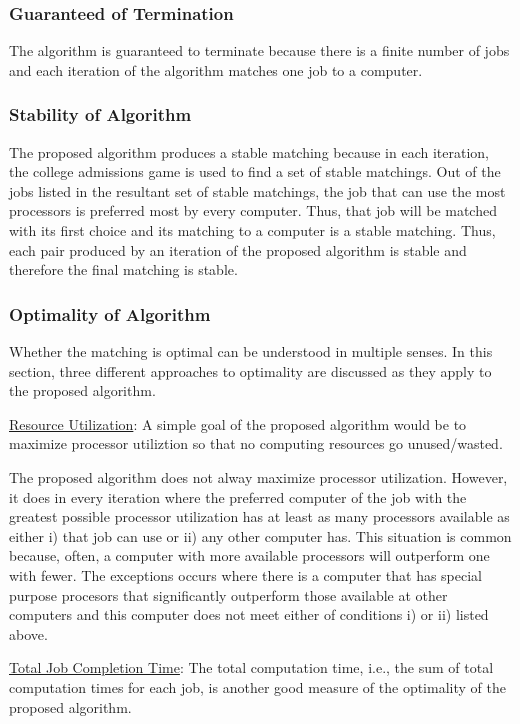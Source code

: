 \documentclass[conference]{IEEEtran}
\begin{document}
\subsubsection{Guaranteed of Termination}
The algorithm is guaranteed to terminate because there is a 
finite number of jobs and each iteration of the algorithm
matches one job to a computer.

\subsubsection{Stability of Algorithm}
The proposed algorithm produces a stable matching because in
each iteration, the college admissions game is used to find
a set of stable matchings.
Out of the jobs listed in the resultant set of stable matchings,
the job that can use the most processors is preferred most
by every computer. Thus, that job will be matched with its first 
choice and its matching to a computer is a stable matching.
Thus, each pair produced by an iteration of the proposed
algorithm is stable and therefore the final matching is stable.

\subsubsection{Optimality of Algorithm}
Whether the matching is optimal can be understood in multiple senses.
In this section, three different approaches to optimality are 
discussed as they apply to the proposed algorithm.

\underline{Resource Utilization}:
A simple goal of the proposed algorithm would be to 
maximize processor utiliztion so that no computing 
resources go unused/wasted.

The proposed algorithm does not alway maximize processor 
utilization. However, it does in every iteration 
where the preferred computer of the job with
the greatest possible processor utilization
has at least as many processors 
available as either
    i) that job can use or
    ii) any other computer has.
This situation is common because, often, a computer with more 
available processors will outperform
one with fewer. The exceptions occurs where there is 
a computer that has special purpose procesors
that significantly outperform those available at other 
computers and this computer does not meet either 
of conditions i) or ii) listed above.

\underline{Total Job Completion Time}:
The total computation time, i.e., the 
sum of total computation times for each job,
is another good measure of the optimality 
of the proposed algorithm.
\end{document}
